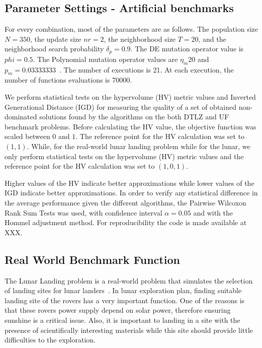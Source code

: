 \subsection{Parameter Settings - Artificial benchmarks}

	For every combination, most of the parameters are as follows. The population size $N = 350$, the update size $nr = 2$, the neighborhood size $T = 20$, and the neighborhood search probability $\delta_p = 0.9$. The DE mutation operator value is $phi=0.5$. The Polynomial mutation operator values are $\eta_m 20$ and $p_m = 0.03333333$~\cite{campelo2018moeadr}. The number of executions is 21. At each execution, the number of functions evaluations is 70000.

We perform statistical tests on the hypervolume (HV) metric values and Inverted Generational Distance (IGD) for measuring the quality of a set of obtained non-dominated solutions found by the algorithms on the both DTLZ and UF benchmark problems. Before calculating the HV value, the objective function was scaled between $0$ and $1$. The reference point for the HV calculation was set to $(1, 1)$. While, for the real-world lunar landing problem while for the lunar,  we only perform statistical tests on the hypervolume (HV) metric values and the reference point for the HV calculation was set to $(1, 0, 1)$. 

Higher values of the HV indicate better approximations while lower values of the IGD indicate better approximations. In order to verify any statistical difference in the average performance given the different algorithms, the Pairwise Wilcoxon Rank Sum Tests was used, with confidence interval $\alpha = 0.05$ and with the Hommel adjustment method. For reproducibility the code is made available at XXX.


\subsection{Real World Benchmark Function}


The Lunar Landing problem is a real-world problem that simulates the selection of landing sites for lunar landers~\citep{MoonOrbitingSatellite2015}. In lunar exploration plan, finding suitable landing site of the rovers has a very important function. One of the reasons is that these rovers power supply depend on solar power, therefore ensuring sunshine is a critical issue. Also, it is important to landing in a site with the presence of scientifically interesting materials while this site should provide little difficulties to the exploration. 

